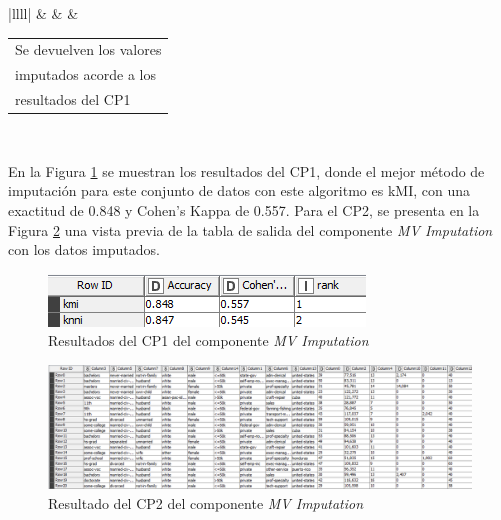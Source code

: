 \begin{table}[H]
\begin{spacing}{1.15}
{\begin{tabular}{|llll|}
			                                                                 &   &  & \begin{tabular}[c]{@{}l@{}}Se devuelven los valores\\ imputados acorde a los\\ resultados del CP1\end{tabular} \\ \hline
		\end{tabular}%
	}
	\end{spacing}
\end{table}

En la Figura \ref{fig:comparacion-mvi} se muestran los resultados del CP1, donde el mejor método de imputación para este conjunto de datos con este algoritmo es kMI, con una exactitud de 0.848 y Cohen's Kappa de 0.557. Para el CP2, se presenta en la Figura \ref{fig:resultado-cp2-mvi} una vista previa de la tabla de salida del componente \textit{MV Imputation} con los datos imputados. 

\begin{figure}[H]
	\centering
	\includegraphics[width=0.5\linewidth]{"figuras/capi 3/pruebas-jenn/comparacion-mvi"}
	\caption{Resultados del CP1 del componente \textit{MV Imputation}}
	\label{fig:comparacion-mvi}
\end{figure}

\begin{figure}[H]
	\centering
	\includegraphics[width=0.8\linewidth]{"figuras/capi 3/pruebas-jenn/resultado-cp2-mvi"}
	\caption{Resultado del CP2 del componente \textit{MV Imputation}}
	\label{fig:resultado-cp2-mvi}
\end{figure}


